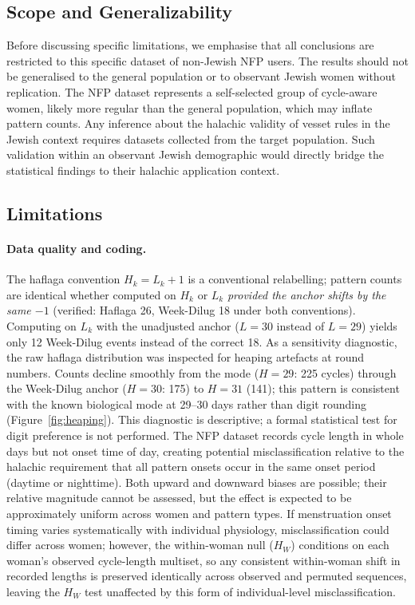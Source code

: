 \documentclass[12pt]{article}
\begin{document}
\subsection{Scope and Generalizability}

Before discussing specific limitations, we emphasise that all conclusions are
restricted to this specific dataset of non-Jewish NFP users. The results should
not be generalised to the general population or to observant Jewish women without
replication. The NFP dataset represents a self-selected group of cycle-aware women,
likely more regular than the general population, which may inflate pattern counts.
Any inference about the halachic validity of vesset rules in the Jewish context
requires datasets collected from the target population.
Such validation within an observant Jewish demographic would directly bridge the
statistical findings to their halachic application context.

\subsection{Limitations}
\label{sec:limitations}

\paragraph{Data quality and coding.}
The haflaga convention $H_k = L_k + 1$ is a conventional relabelling; pattern counts
are identical whether computed on $H_k$ or $L_k$ \emph{provided the anchor shifts by the
same $-1$} (verified: Haflaga 26, Week-Dilug 18 under both conventions).
Computing on $L_k$ with the unadjusted anchor ($L = 30$ instead of $L = 29$) yields
only 12 Week-Dilug events instead of the correct 18.
As a sensitivity diagnostic, the raw haflaga distribution was inspected for heaping
artefacts at round numbers. Counts decline smoothly from the mode ($H = 29$: 225
cycles) through the Week-Dilug anchor ($H = 30$: 175) to $H = 31$ (141); this
pattern is consistent with the known biological mode at 29--30 days rather than
digit rounding (Figure~\ref{fig:heaping}). This diagnostic is descriptive; a formal
statistical test for digit preference is not performed.
The NFP dataset records cycle length in whole days but not onset time of day, creating
potential misclassification relative to the halachic requirement that all pattern
onsets occur in the same onset period (daytime or nighttime). Both upward and downward
biases are possible; their relative magnitude cannot be assessed, but the effect is
expected to be approximately uniform across women and pattern types. If menstruation onset timing varies systematically with individual physiology, misclassification could differ across women; however, the within-woman null ($H_W$) conditions on each woman's observed cycle-length multiset, so any consistent within-woman shift in recorded lengths is preserved identically across observed and permuted sequences, leaving the $H_W$ test unaffected by this form of individual-level misclassification.
\end{document}
